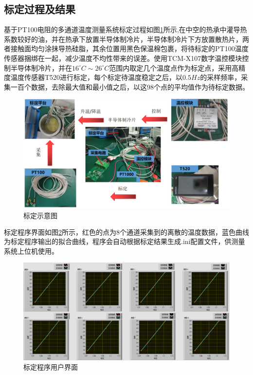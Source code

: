\subsection{标定过程及结果}
基于PT100电阻的多通道温度测量系统标定过程如图\ref{fig:标定示意图}所示,在中空的热承中灌导热系数较好的油，并在热承下放置半导体制冷片，半导体制冷片下方放置散热片，两者接触面均匀涂抹导热硅脂，其余位置用黑色保温棉包裹，将待标定的PT100温度传感器捆绑在一起，减少温度不均性带来的误差。使用TCM-X107数字温控模块控制半导体制冷片，并在\(16^{\circ}C \sim 26^{\circ}C\)范围内取定几个温度点作为标定点，采用高精度温度传感器T520进行标定，每个标定待温度稳定之后，以\(0.5Hz\)的采样频率，采集一百个数据，去除最大值和最小值之后，以这98个点的平均值作为待标定数据。
  \begin{figure}[htb]
    \centering
    \includegraphics[width=12cm]{fig/3-fig/温度测量系统标定示意图.jpg}
    \caption{标定示意图}
    \label{fig:标定示意图}
\end{figure}

标定程序界面如图\ref{fig:标定程序用户界面}所示，红色的点为8个通道采集到的离散的温度数据，蓝色曲线为标定程序输出的拟合曲线，程序会自动根据标定结果生成.ini配置文件，供测量系统上位机使用。
\begin{figure}[htb]
    \centering
    \includegraphics[width=12cm]{fig/3-fig/标定程序前面板.jpg}
    \caption{标定程序用户界面}
    \label{fig:标定程序用户界面}
\end{figure}

